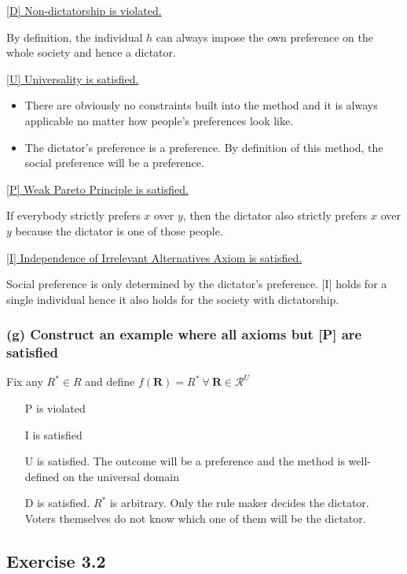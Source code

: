 \documentclass[a4paper]{article}
\begin{document}
\underline{[D] Non-dictatorship is violated.} 

By definition, the individual $h$ can always impose the own preference on the whole society and hence a dictator.

\underline{[U] Universality is satisfied.}

\begin{itemize}
    \item There are obviously no constraints built into the method and it is always applicable no matter how people's preferences look like.
    \item The dictator's preference is a preference. By definition of this method, the social preference will be a preference.
\end{itemize}

\underline{[P] Weak Pareto Principle is satisfied.}

If everybody strictly prefers $x$ over $y$, then the dictator also strictly prefers $x$ over $y$ because the dictator is one of those people.

\underline{[I] Independence of Irrelevant Alternatives Axiom is satisfied.}

Social preference is only determined by the dictator's preference. [I] holds for a single individual hence it also holds for the society with dictatorship. 

\subsubsection*{(g) Construct an example where all axioms but [P] are satisfied}

Fix any $R^*\in R$ and define $f(\mathbf{R})=R^*\:\forall\:\mathbf{R}\in\mathscr{R}^{U}$
\begin{itemize}
    \item [P] is violated
    \item [I] is satisfied
    \item [U] is satisfied. The outcome will be a preference and the method is well-defined on the universal domain
    \item [D] is satisfied. $R^*$ is arbitrary. Only the rule maker decides the dictator. Voters themselves do not know which one of them will be the dictator.
\end{itemize}

\subsection*{Exercise 3.2}
\end{document}
